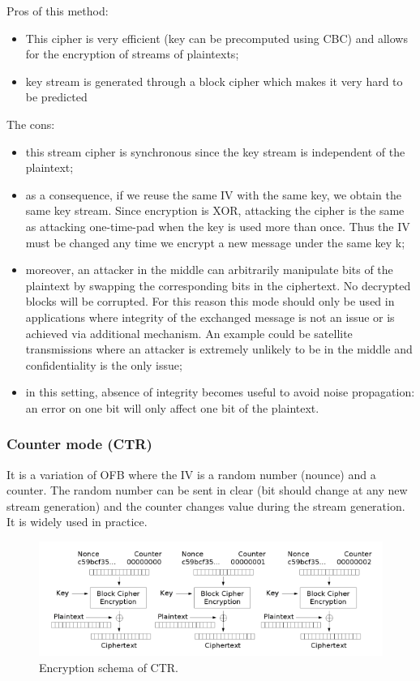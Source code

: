 \documentclass[a4paper, 12pt]{report}
\begin{document}
Pros of this method:
\begin{itemize}
	\item This cipher is very efficient (key can be precomputed using CBC) and allows for the encryption of streams of plaintexts;
	\item key stream is generated through a block cipher which makes it very hard to be predicted
\end{itemize}  

The cons:
\begin{itemize}
	\item this stream cipher is synchronous since the key stream is independent of the plaintext;
	\item as a consequence, if we reuse the same IV with the same key, we obtain the same key stream. Since encryption is XOR, attacking the cipher is the same as attacking one-time-pad when the key is used more than once. Thus the IV must be changed any time we encrypt a new message under the same key k;
	\item moreover, an attacker in the middle can arbitrarily manipulate bits of the plaintext by swapping the corresponding bits in the ciphertext. No decrypted blocks will be corrupted. For this reason this mode should only be used in applications where integrity of the exchanged message is not an issue or is achieved via additional mechanism. An example could be satellite transmissions where an attacker is extremely unlikely to be in the middle and confidentiality is the only issue;
	\item in this setting, absence of integrity becomes useful to avoid noise propagation: an error on one bit will only affect one bit of the plaintext.
\end{itemize}

\subsubsection{Counter mode (CTR)}
It is a variation of OFB where the IV is a random number (nounce) and a counter. The random number can be sent in clear (bit should change at any new stream generation) and the counter changes value during the stream generation. It is widely used in practice.

\begin{figure}[H]
	\centering
	\includegraphics[scale=0.8]{images/Lec9/encCTR.png}
	\caption{Encryption schema of CTR.}
	\label{fig:encCTR}
\end{figure}
\end{document}
